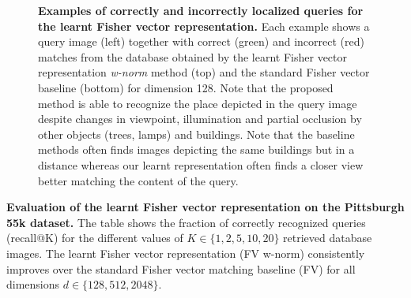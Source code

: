     \begin{figure}[tbp]
      
            \caption{
          \textbf{Examples of correctly and incorrectly localized queries for the learnt Fisher vector representation.}
          Each example shows a query image (left) together with correct (green) and incorrect (red) matches from the database obtained by the learnt Fisher vector representation \emph{w-norm} method (top) and the standard Fisher vector baseline (bottom) for dimension 128. Note that the proposed method is able to recognize the place depicted in the query image despite changes in viewpoint, illumination and partial occlusion by other objects (trees, lamps) and buildings. 
          Note that the baseline methods often finds images depicting the same buildings but in a distance whereas our learnt representation often finds a closer view better matching the content of the query.  
%      
}
      \label{fig:images_bow}
    \end{figure}
    
    \begin{table}[bh]
      \begin{centering}
        
                \caption{ 
          \textbf{Evaluation of the learnt Fisher vector representation on the Pittsburgh 55k dataset.}
           The table shows the fraction of correctly recognized queries (recall@K) for the different values of $K\in\{1,2,5,10,20\}$ retrieved database images. 
	   The learnt Fisher vector representation (FV w-norm) consistently improves over the standard Fisher vector matching baseline (FV) for all dimensions $d\in\{128,512,2048\}$.
        }
        \label{tab:recallFV55k}
      \end{centering}
    \end{table}

 
